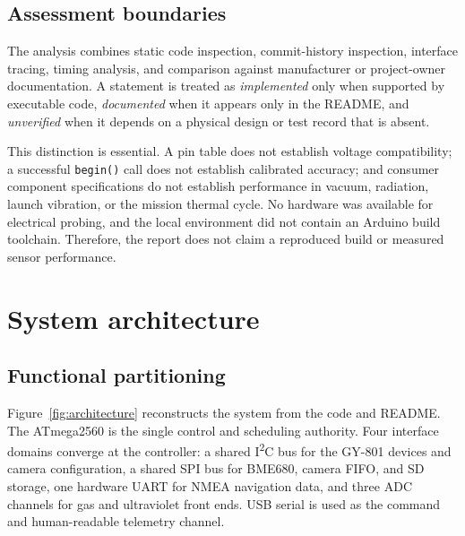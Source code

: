 \documentclass[11pt,a4paper]{article}
\newcommand{\code}[1]{\texttt{#1}}
\begin{document}
\subsection{Assessment boundaries}

The analysis combines static code inspection, commit-history inspection, interface tracing, timing analysis, and comparison against manufacturer or project-owner documentation. A statement is treated as \emph{implemented} only when supported by executable code, \emph{documented} when it appears only in the README, and \emph{unverified} when it depends on a physical design or test record that is absent.

This distinction is essential. A pin table does not establish voltage compatibility; a successful \code{begin()} call does not establish calibrated accuracy; and consumer component specifications do not establish performance in vacuum, radiation, launch vibration, or the mission thermal cycle. No hardware was available for electrical probing, and the local environment did not contain an Arduino build toolchain. Therefore, the report does not claim a reproduced build or measured sensor performance.

\section{System architecture}

\subsection{Functional partitioning}

Figure~\ref{fig:architecture} reconstructs the system from the code and README. The ATmega2560 is the single control and scheduling authority. Four interface domains converge at the controller: a shared I\textsuperscript{2}C bus for the GY-801 devices and camera configuration, a shared SPI bus for BME680, camera FIFO, and SD storage, one hardware UART for NMEA navigation data, and three ADC channels for gas and ultraviolet front ends. USB serial is used as the command and human-readable telemetry channel.
\end{document}
